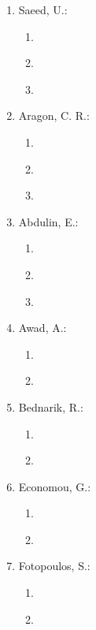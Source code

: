\begin{enumerate}[label=\arabic*.,ref=\arabic*]
    \item Saeed, U.:              
    \begin{enumerate}[label*=\arabic*.,ref=\theenumi.\arabic*]
        \item \cite{saeed2014survey} 
        \item \cite{saeed2016eye} 
        \item \cite{saeed2014automatic}			 
    \end{enumerate}
    \item Aragon, C. R.:           
    \begin{enumerate}[label*=\arabic*.,ref=\theenumi.\arabic*]
        \item \cite{komogortsev2012biometric} 
        \item \cite{komogortsev2010biometric} 
        \item \cite{brooks2013perceptions}			 
    \end{enumerate}
    \item Abdulin, E.:            
    \begin{enumerate}[label*=\arabic*.,ref=\theenumi.\arabic*]
        \item \cite{rigas2016towards} 
        \item \cite{abdulin2015person} 
        \item \cite{abdulin2016eye}			
    \end{enumerate}
    \item Awad, A.:               
    \begin{enumerate}[label*=\arabic*.,ref=\theenumi.\arabic*]
        \item \cite{rose2017biometric} 
        \item \cite{rose2017biometricb}			 
    \end{enumerate}
    \item Bednarik, R.:
    \begin{enumerate}[label*=\arabic*.,ref=\theenumi.\arabic*]
        \item \cite{bednarik2005eye} 
        \item \cite{kinnunen2010towards}				 
    \end{enumerate}
    \item Economou, G.:          
    \begin{enumerate}[label*=\arabic*.,ref=\theenumi.\arabic*]
        \item \cite{rigas2012biometric} 
        \item \cite{rigas2012human}			
    \end{enumerate}
    \item Fotopoulos, S.:        
    \begin{enumerate}[label*=\arabic*.,ref=\theenumi.\arabic*]
        \item \cite{rigas2012biometric} 
        \item \cite{rigas2012human}	
    \end{enumerate}
\end{enumerate}

